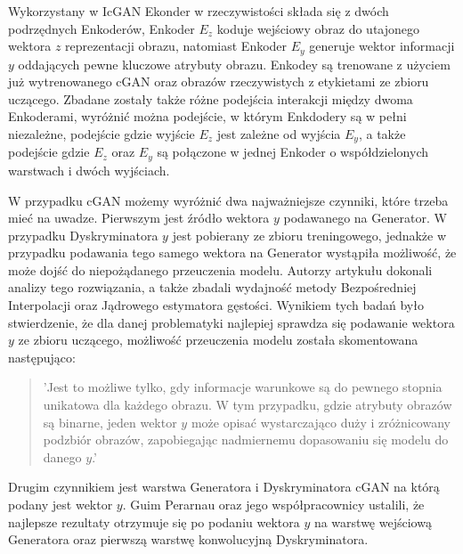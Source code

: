     Wykorzystany w IcGAN Ekonder w rzeczywistości składa się z dwóch podrzędnych
    Enkoderów, Enkoder $E_{z}$ koduje wejściowy obraz do utajonego wektora $z$ reprezentacji
    obrazu, natomiast Enkoder $E_{y}$ generuje wektor informacji $y$ oddających
    pewne kluczowe atrybuty obrazu. Enkodey są trenowane z użyciem już wytrenowanego
    cGAN oraz obrazów rzeczywistych z etykietami ze zbioru uczącego. Zbadane
    zostały także różne podejścia interakcji między dwoma Enkoderami, wyróżnić
    można podejście, w którym Enkdodery są w pełni niezależne, podejście
    gdzie wyjście $E_{z}$ jest zależne od wyjścia $E_{y}$, a także podejście
    gdzie $E_{z}$ oraz $E_{y}$ są połączone w jednej Enkoder o współdzielonych
    warstwach i dwóch wyjściach.

    W przypadku cGAN możemy wyróżnić dwa najważniejsze czynniki, które trzeba
    mieć na uwadze. Pierwszym jest źródło wektora $y$ podawanego na
    Generator. W przypadku Dyskryminatora $y$ jest pobierany ze
    zbioru treningowego, jednakże w przypadku podawania tego
    samego wektora na Generator wystąpiła możliwość, że może dojść do niepożądanego
    przeuczenia modelu. Autorzy artykułu dokonali analizy tego rozwiązania,
    a także zbadali wydajność metody Bezpośredniej Interpolacji oraz
    Jądrowego estymatora gęstości. Wynikiem tych badań było stwierdzenie, że
    dla danej problematyki najlepiej sprawdza się podawanie wektora $y$ ze zbioru
    uczącego, możliwość przeuczenia modelu została skomentowana następująco:
    \begin{quote}
      'Jest to możliwe tylko, gdy informacje warunkowe są do pewnego stopnia
      unikatowa dla każdego obrazu. W tym przypadku, gdzie atrybuty obrazów są
      binarne, jeden wektor $y$ może opisać wystarczająco duży i zróżnicowany
      podzbiór obrazów, zapobiegając nadmiernemu dopasowaniu się modelu do
      danego $y$.'
    \end{quote}
    
    Drugim czynnikiem jest warstwa Generatora i Dyskryminatora cGAN na
    którą podany jest wektor $y$. Guim Perarnau oraz jego współpracownicy ustalili, że najlepsze rezultaty otrzymuje się po podaniu wektora $y$ na warstwę wejściową
    Generatora oraz pierwszą warstwę konwolucyjną Dyskryminatora.

